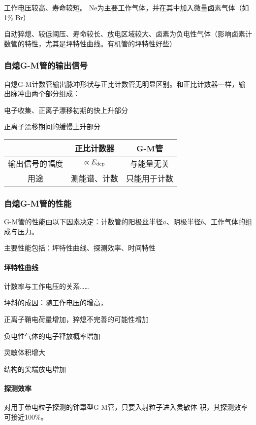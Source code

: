 工作电压较高、寿命较短。
Ne为主要工作气体，并在其中加入微量卤素气体（如1\% Br）

自动猝熄、较低阈压、寿命较长、放电区域较大、卤素为负电性气体（影响卤素计数管的特性，尤其是坪特性曲线。有机管的坪特性好些）
\subsubsection{自熄G-M管的输出信号}
自熄G-M计数管输出脉冲形状与正比计数管无明显区别。和正比计数器一样，输出脉冲由两个部分组成：
\begin{compactenum}
	\item 电子收集、正离子漂移初期的快上升部分
	\item 正离子漂移期间的缓慢上升部分
\end{compactenum}
\begin{center}
	\begin{tabular}{ccc}
		\toprule
		&正比计数器&G-M管\\
		\midrule
		输出信号的幅度&$\propto E_{\mathrm{dep}}$&与能量无关\\
		用途&测能谱、计数&只能用于计数\\
		\bottomrule
	\end{tabular}
\end{center}
\subsubsection{自熄G-M管的性能}
G-M管的性能由以下因素决定：计数管的阳极丝半径$a$、阴极半径$b$、工作气体的组成与压力。

主要性能包括：坪特性曲线、探测效率、时间特性
\paragraph{坪特性曲线}计数率与工作电压的关系……

坪斜的成因：随工作电压的增高，
\begin{compactenum}
	\item 正离子鞘电荷量增加，猝熄不完善的可能性增加
	\item 负电性气体的电子释放概率增加
	\item 灵敏体积增大
	\item 结构的尖端放电增加
\end{compactenum}
\paragraph{探测效率}
对用于带电粒子探测的钟罩型G-M管，只要入射粒子进入灵敏体
积，其探测效率可接近100\%。

